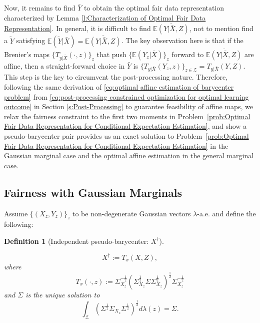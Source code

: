 \documentclass[twoside,11pt]{article}
\newtheorem{defi}{Definition}[section]{\bfseries}{\itshape}
\begin{document}
Now, it remains to find $\bar{Y}$ to obtain the optimal fair data representation characterized by Lemma \ref{l:Characterization of Optimal Fair Data Representation}. In general, it is difficult to find $\overline{\mathbb{E} (Y| \bar{X},Z) }$, not to mention find a $\tilde{Y}$ satisfying $\mathbb{E}(\tilde{Y}|\bar{X}) = \overline{\mathbb{E} (Y| \bar{X},Z) }$. The key observation here is that if the Brenier's maps $\{T_{y|\bar{X}}(\cdot,z)\}_z$ that push $\{ \mathbb{E} (Y_z | \bar{X}) \}_z$ forward to $\overline{\mathbb{E} (Y| \bar{X},Z) }$ are affine, then a straight-forward choice in $\bar{Y}$ is $\{T_{y|\bar{X}}(Y_z,z)\}_{z \in \mathcal{Z}} = T_{y|\bar{X}}(Y,Z)$. This step is the key to circumvent the post-processing nature. Therefore, following the same derivation of \eqref{eq:optimal affine estimation of barycenter problem} from \eqref{eq:post-processing constrained optimization for optimal learning outcome} in Section \ref{s:Post-Processing} to guarantee feasibility of affine maps, we relax the fairness constraint to the first two moments in Problem~\ref{prob:Optimal Fair Data Representation for Conditional Expectation Estimation}, and show a pseudo-barycenter pair provides us an exact solution to Problem~\ref{prob:Optimal Fair Data Representation for Conditional Expectation Estimation} in the Gaussian marginal case and the optimal affine estimation in the general marginal case.

\subsection{Fairness with Gaussian Marginals}

Assume $\{(X_z, Y_z)\}_z$ to be non-degenerate Gaussian vectors $\lambda$-a.e. and define the following:

\begin{defi}[Independent pseudo-barycenter: $X^{\dag}$] \label{d:Independent Pseudo-barycenter}

\begin{equation}\label{eq:independent pseudo-barycenter }
X^{\dag} := T_{x}(X,Z),
\end{equation}
where
\begin{equation} \label{eq:independent pseudo-barycenter affine map}
T_{x}(\cdot,z) :=  \Sigma_{X_z}^{-\frac{1}{2}} (\Sigma_{X_z}^{\frac{1}{2}} \Sigma \Sigma_{X_z}^{\frac{1}{2}} )^{\frac{1}{2}} \Sigma_{X_z}^{-\frac{1}{2}}
\end{equation}
and $\Sigma$ is the unique solution to
\begin{equation} \label{eq:independent pseudo-barycenter cov estimation}
\int_{\mathcal{Z}} (\Sigma^{\frac{1}{2}} \Sigma_{X_z} \Sigma^{\frac{1}{2}})^{\frac{1}{2}} d\lambda(z) = \Sigma.
\end{equation}
\end{defi}
\end{document}

